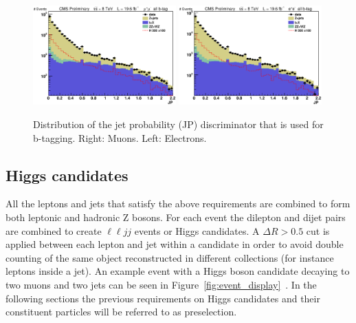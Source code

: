 

\begin{figure}[htb]
\begin{center}
\centerline{
\includegraphics[width=0.49\textwidth]{presentation/defense/images/preselection/mu/j0jp_log.eps}
\includegraphics[width=0.49\textwidth]{presentation/defense/images/preselection/el/j0jp_log.eps}
}
\caption{
Distribution of the jet probability (JP) discriminator that is used for b-tagging.  Right: Muons. Left: Electrons.
}
\label{fig:JP}
\end{center}
\end{figure}


\subsection{Higgs candidates}
\label{sec:reco}
All the leptons and jets that satisfy the above requirements are combined to form both leptonic and hadronic Z bosons.  For each event the dilepton and dijet pairs are combined to create $\ell \ell jj$ events or Higgs candidates. A $\Delta R > 0.5$ cut is applied between each lepton and jet within a candidate in order to avoid double counting of the same object reconstructed in different collections (for instance leptons inside a jet). An example event with a Higgs boson candidate decaying to two muons and two jets can be seen in Figure~\ref{fig:event_display}~\cite{CMS-PAS-HIG-12-024}. In the following sections the previous requirements on Higgs candidates and their constituent particles will be referred to as preselection.

